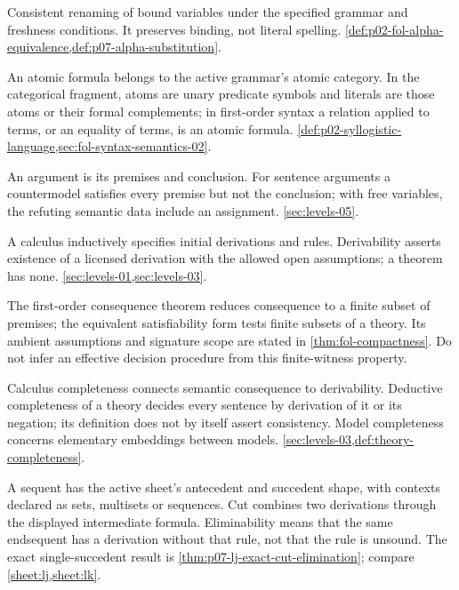 \begin{description}[style=nextline,leftmargin=0pt]
\item[Alpha-equivalence.]
Consistent renaming of bound variables under the specified grammar and
freshness conditions. It preserves binding, not literal spelling.
\cref{def:p02-fol-alpha-equivalence,def:p07-alpha-substitution}.
\item[Atom; literal.]
An atomic formula belongs to the active grammar's atomic category. In the
categorical fragment, atoms are unary predicate symbols and literals are
those atoms or their formal complements; in first-order syntax a relation
applied to terms, or an equality of terms, is an atomic formula.
\cref{def:p02-syllogistic-language,sec:fol-syntax-semantics-02}.
\item[Argument; countermodel.]
An argument is its premises and conclusion. For sentence arguments a
countermodel satisfies every premise but not the conclusion; with free
variables, the refuting semantic data include an assignment.
\cref{sec:levels-05}.
\item[Calculus; derivation; theorem.]
A calculus inductively specifies initial derivations and rules. Derivability
asserts existence of a licensed derivation with the allowed open assumptions;
a theorem has none. \cref{sec:levels-01,sec:levels-03}.
\item[Compactness.]
The first-order consequence theorem reduces consequence to a finite subset
of premises; the equivalent satisfiability form tests finite subsets of a
theory. Its ambient assumptions and signature scope are stated in
\cref{thm:fol-compactness}. Do not infer an effective decision procedure
from this finite-witness property.
\item[Completeness; model completeness.]
Calculus completeness connects semantic consequence to derivability.
Deductive completeness of a theory decides every sentence by derivation of
it or its negation; its definition does not by itself assert consistency.
Model completeness concerns elementary embeddings between models.
\cref{sec:levels-03,def:theory-completeness}.
\item[Cut; sequent; context.]
A sequent has the active sheet's antecedent and succedent shape, with
contexts declared as sets, multisets or sequences. Cut combines two
derivations through the displayed intermediate formula. Eliminability
means that the same endsequent has a derivation without that rule, not that
the rule is unsound. The exact single-succedent result is
\cref{thm:p07-lj-exact-cut-elimination}; compare \cref{sheet:lj,sheet:lk}.

\end{description}
